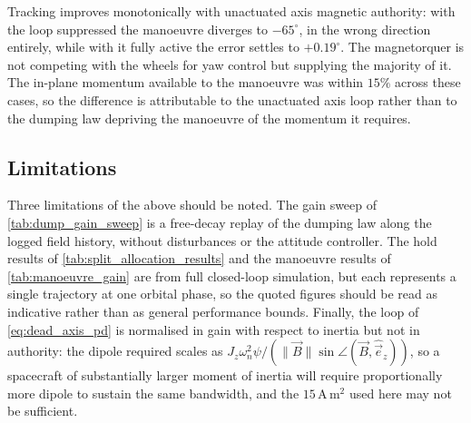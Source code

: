 Tracking improves monotonically with unactuated axis magnetic authority: with the loop suppressed the manoeuvre diverges to $-65^\circ$, in the wrong direction entirely, while with it fully active the error settles to $+0.19^\circ$. The magnetorquer is not competing with the wheels for yaw control but supplying the majority of it. The in-plane momentum available to the manoeuvre was within $15\%$ across these cases, so the difference is attributable to the unactuated axis loop rather than to the dumping law depriving the manoeuvre of the momentum it requires.


\subsection{Limitations}
Three limitations of the above should be noted. The gain sweep of \autoref{tab:dump_gain_sweep} is a free-decay replay of the dumping law along the logged field history, without disturbances or the attitude controller. The hold results of \autoref{tab:split_allocation_results} and the manoeuvre results of \autoref{tab:manoeuvre_gain} are from full closed-loop simulation, but each represents a single trajectory at one orbital phase, so the quoted figures should be read as indicative rather than as general performance bounds. Finally, the loop of \autoref{eq:dead_axis_pd} is normalised in gain with respect to inertia but not in authority: the dipole required scales as $J_z\omega_n^2\psi/(\|\vec{B}\|\sin\angle(\vec{B},\hat{\vec{e}}_z))$, so a spacecraft of substantially larger moment of inertia will require proportionally more dipole to sustain the same bandwidth, and the $15\,\mathrm{A\,m^2}$ used here may not be sufficient.